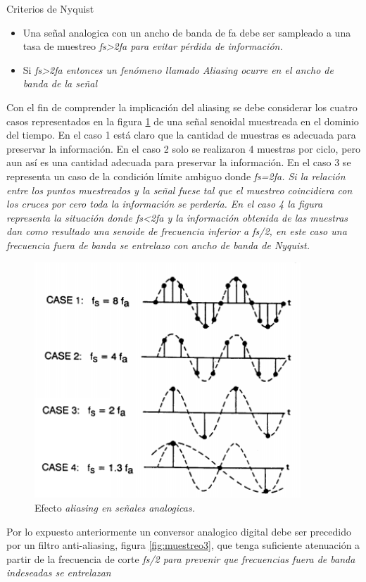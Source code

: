Criterios de Nyquist
\begin{itemize}
\item Una señal analogica con un ancho de banda de fa debe ser sampleado a una tasa de muestreo \it{fs>2fa} para evitar pérdida de información.
\item Si \it{fs>2fa} entonces un fenómeno llamado Aliasing ocurre en el ancho de banda de la señal
\end{itemize}

Con el fin de comprender la implicación del aliasing se debe considerar los cuatro casos representados en la figura \ref{fig:muestreo2} de una señal senoidal muestreada en el dominio del tiempo.
En el caso 1 está claro que la cantidad de muestras es adecuada para preservar la información. En el caso 2 solo se realizaron 4 muestras por ciclo, pero aun así es una cantidad adecuada para preservar la información. En el caso 3 se representa un caso de la condición límite ambiguo donde \it{fs=2fa}. Si la relación entre los puntos muestreados y la señal fuese tal que el muestreo coincidiera con los cruces por cero toda la información se perdería. En el caso 4 la figura representa la situación donde \it{fs<2fa} y la información obtenida de las muestras dan como resultado una senoide de frecuencia inferior a \it{fs/2}, en este caso una frecuencia fuera de banda se entrelazo con ancho de banda de Nyquist. 

\begin{figure}[ht]
	\centering
	\includegraphics[width=100mm]{./Figures/muestreo2.png}
	\caption{Efecto \it{aliasing} en señales analogicas.}
	\label{fig:muestreo2}
\end{figure}

Por lo expuesto anteriormente un conversor analogico digital debe ser precedido por un filtro anti-aliasing, figura \ref{fig:muestreo3}, que tenga suficiente atenuación a partir de la frecuencia de corte \it{fs/2} para prevenir que frecuencias fuera de banda indeseadas se entrelazan

